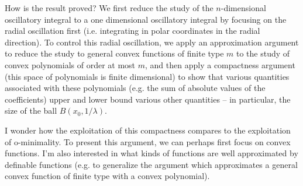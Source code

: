 How is the result proved? We first reduce the study of the $n$-dimensional oscillatory integral to a one dimensional oscillatory integral by focusing on the radial oscillation first (i.e. integrating in polar coordinates in the radial direction). To control this radial oscillation, we apply an approximation argument to reduce the study to general convex functions of finite type $m$ to the study of convex polynomials of order at most $m$, and then apply a compactness argument (this space of polynomials is finite dimensional) to show that various quantities associated with these polynomials (e.g. the sum of absolute values of the coefficients) upper and lower bound various other quantities -- in particular, the size of the ball $B(x_0,1/\lambda)$.

I wonder how the exploitation of this compactness compares to the exploitation of o-minimality. To present this argument, we can perhaps first focus on convex functions. I'm also interested in what kinds of functions are well approximated by definable functions (e.g. to generalize the argument which approximates a general convex function of finite type with a convex polynomial).


